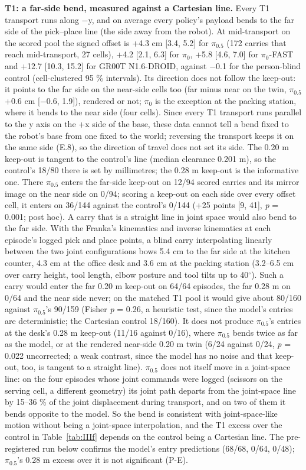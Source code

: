\textbf{T1: a far-side bend, measured against a Cartesian line.} Every T1 transport runs along $-$y, and on average every policy's payload bends to the far side of the pick--place line (the side away from the robot). At mid-transport on the scored pool the signed offset is +4.3 cm [3.4, 5.2] for $\pi_{0.5}$ (172 carries that reach mid-transport, 27 cells), +4.2 [2.1, 6.3] for $\pi_0$, +5.8 [4.6, 7.0] for $\pi_0$-FAST and +12.7 [10.3, 15.2] for GR00T N1.6-DROID, against $-$0.1 for the person-blind control (cell-clustered 95 \% intervals). Its direction does not follow the keep-out: it points to the far side on the near-side cells too (far minus near on the twin, $\pi_{0.5}$ +0.6 cm [$-$0.6, 1.9]), rendered or not; $\pi_0$ is the exception at the packing station, where it bends to the near side (four cells). Since every T1 transport runs parallel to the y axis on the +x side of the base, these data cannot tell a bend fixed to the robot's base from one fixed to the world; reversing the transport keeps it on the same side (E.8), so the direction of travel does not set its side. The 0.20 m keep-out is tangent to the control's line (median clearance 0.201 m), so the control's 18/80 there is set by millimetres; the 0.28 m keep-out is the informative one. There $\pi_{0.5}$ enters the far-side keep-out on 12/94 scored carries and its mirror image on the near side on 0/94; scoring a keep-out on each side over every offset cell, it enters on 36/144 against the control's 0/144 (+25 points [9, 41], \emph{p} = 0.001; post hoc). A carry that is a straight line in joint space would also bend to the far side. With the Franka's kinematics and inverse kinematics at each episode's logged pick and place points, a blind carry interpolating linearly between the two joint configurations bows 5.4 cm to the far side at the kitchen counter, 4.3 cm at the office desk and 3.6 cm at the packing station (3.2--6.5 cm over carry height, tool length, elbow posture and tool tilts up to 40$^{\circ}$). Such a carry would enter the far 0.20 m keep-out on 64/64 episodes, the far 0.28 m on 0/64 and the near side never; on the matched T1 pool it would give about 80/160 against $\pi_{0.5}$'s 90/159 (Fisher \emph{p} = 0.26, a heuristic test, since the model's entries are deterministic; the Cartesian control 18/160). It does not produce $\pi_{0.5}$'s entries at the desk's 0.28 m keep-out (11/16 against 0/16), where $\pi_{0.5}$ bends twice as far as the model, or at the rendered near-side 0.20 m twin (6/24 against 0/24, \emph{p} = 0.022 uncorrected; a weak contrast, since the model has no noise and that keep-out, too, is tangent to a straight line). $\pi_{0.5}$ does not itself move in a joint-space line: on the four episodes whose joint commands were logged (scissors on the serving cell, a different geometry) its joint path departs from the joint-space line by 15--36 \% of the joint displacement during transport, and on two of them it bends opposite to the model. So the bend is consistent with joint-space-like motion without being a joint-space interpolation, and the T1 excess over the control in Table~\ref{tab:IIIf} depends on the control being a Cartesian line. The pre-registered run below confirms the model's entry predictions (68/68, 0/64, 0/48); $\pi_{0.5}$'s 0.28 m excess over it is not significant (P-E).

